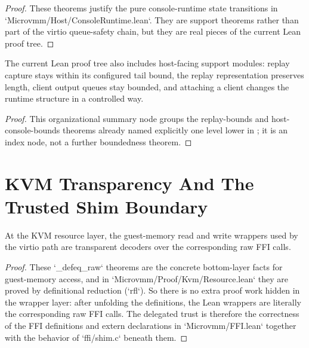 \begin{proof}
\leanok
These theorems justify the pure console-runtime state transitions in `Microvmm/Host/ConsoleRuntime.lean`.
They are support theorems rather than part of the virtio queue-safety chain, but they are real pieces of the current Lean proof tree.
\end{proof}

\begin{theorem}
\label{thm:host-console-support}
\leanok
The current Lean proof tree also includes host-facing support modules: replay capture stays within its configured tail bound, the replay representation preserves length, client output queues stay bounded, and attaching a client changes the runtime structure in a controlled way.
\end{theorem}

\begin{proof}
\leanok
{}
This organizational summary node groups the replay-bounds and host-console-bounds theorems already named explicitly one level lower in ; it is an index node, not a further boundedness theorem.
\end{proof}

\section{KVM Transparency And The Trusted Shim Boundary}

\begin{theorem}
\label{thm:kvm-guest-memory-transparency}
\leanok
At the KVM resource layer, the guest-memory read and write wrappers used by the virtio path are transparent decoders over the corresponding raw FFI calls.
\end{theorem}

\begin{proof}
\leanok
These `_defeq_raw` theorems are the concrete bottom-layer facts for guest-memory access, and in `Microvmm/Proof/Kvm/Resource.lean` they are proved by definitional reduction (`rfl`).
So there is no extra proof work hidden in the wrapper layer: after unfolding the definitions, the Lean wrappers are literally the corresponding raw FFI calls.
The delegated trust is therefore the correctness of the FFI definitions and extern declarations in `Microvmm/FFI.lean` together with the behavior of `ffi/shim.c` beneath them.
\end{proof}


